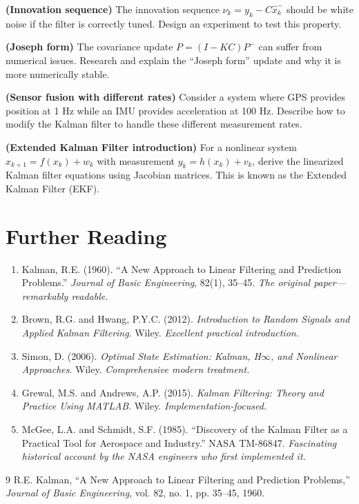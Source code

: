 \begin{exercise}
\textbf{(Innovation sequence)} The innovation sequence $\nu_k = y_k - C\hat{x}_k^-$ should be white noise if the filter is correctly tuned. Design an experiment to test this property.
\end{exercise}

\begin{exercise}
\textbf{(Joseph form)} The covariance update $P = (I-KC)P^-$ can suffer from numerical issues. Research and explain the ``Joseph form'' update and why it is more numerically stable.
\end{exercise}

\begin{exercise}
\textbf{(Sensor fusion with different rates)} Consider a system where GPS provides position at 1 Hz while an IMU provides acceleration at 100 Hz. Describe how to modify the Kalman filter to handle these different measurement rates.
\end{exercise}

\begin{exercise}
\textbf{(Extended Kalman Filter introduction)} For a nonlinear system $x_{k+1} = f(x_k) + w_k$ with measurement $y_k = h(x_k) + v_k$, derive the linearized Kalman filter equations using Jacobian matrices. This is known as the Extended Kalman Filter (EKF).
\end{exercise}

\section{Further Reading}

\begin{enumerate}
    \item Kalman, R.E. (1960). ``A New Approach to Linear Filtering and Prediction Problems.'' \textit{Journal of Basic Engineering}, 82(1), 35--45. \textit{The original paper---remarkably readable.}

    \item Brown, R.G. and Hwang, P.Y.C. (2012). \textit{Introduction to Random Signals and Applied Kalman Filtering}. Wiley. \textit{Excellent practical introduction.}

    \item Simon, D. (2006). \textit{Optimal State Estimation: Kalman, H$\infty$, and Nonlinear Approaches}. Wiley. \textit{Comprehensive modern treatment.}

    \item Grewal, M.S. and Andrews, A.P. (2015). \textit{Kalman Filtering: Theory and Practice Using MATLAB}. Wiley. \textit{Implementation-focused.}

    \item McGee, L.A. and Schmidt, S.F. (1985). ``Discovery of the Kalman Filter as a Practical Tool for Aerospace and Industry.'' NASA TM-86847. \textit{Fascinating historical account by the NASA engineers who first implemented it.}
\end{enumerate}

\begin{thebibliography}{9}
R.E. Kalman, ``A New Approach to Linear Filtering and Prediction Problems,'' \textit{Journal of Basic Engineering}, vol. 82, no. 1, pp. 35--45, 1960.
\end{thebibliography}
